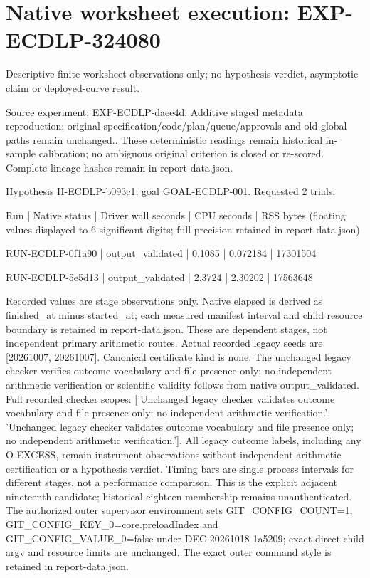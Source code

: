 \documentclass[10pt]{article}
\begin{document}
\section*{Native worksheet execution: EXP-ECDLP-324080}
Descriptive finite worksheet observations only; no hypothesis verdict, asymptotic claim or deployed-curve result.\par\medskip
Source experiment: EXP-ECDLP-daee4d. Additive staged metadata reproduction; original specification/code/plan/queue/approvals and old global paths remain unchanged.. These deterministic readings remain historical in-sample calibration; no ambiguous original criterion is closed or re-scored. Complete lineage hashes remain in report-data.json.\par\medskip
Hypothesis H-ECDLP-b093c1; goal GOAL-ECDLP-001. Requested 2 trials.\par\medskip
Run | Native status | Driver wall seconds | CPU seconds | RSS bytes (floating values displayed to 6 significant digits; full precision retained in report-data.json)\par
RUN-ECDLP-0f1a90 | output\_validated | 0.1085 | 0.072184 | 17301504\par
RUN-ECDLP-5e5d13 | output\_validated | 2.3724 | 2.30202 | 17563648\par\medskip
Recorded values are stage observations only. Native elapsed is derived as finished\_at minus started\_at; each measured manifest interval and child resource boundary is retained in report-data.json. These are dependent stages, not independent primary arithmetic routes. Actual recorded legacy seeds are [20261007, 20261007]. Canonical certificate kind is none. The unchanged legacy checker verifies outcome vocabulary and file presence only; no independent arithmetic verification or scientific validity follows from native output\_validated. Full recorded checker scopes: ['Unchanged legacy checker validates outcome vocabulary and file presence only; no independent arithmetic verification.', 'Unchanged legacy checker validates outcome vocabulary and file presence only; no independent arithmetic verification.']. All legacy outcome labels, including any O-EXCESS, remain instrument observations without independent arithmetic certification or a hypothesis verdict. Timing bars are single process intervals for different stages, not a performance comparison. This is the explicit adjacent nineteenth candidate; historical eighteen membership remains unauthenticated. The authorized outer supervisor environment sets GIT\_CONFIG\_COUNT=1, GIT\_CONFIG\_KEY\_0=core.preloadIndex and GIT\_CONFIG\_VALUE\_0=false under DEC-20261018-1a5209; exact direct child argv and resource limits are unchanged. The exact outer command style is retained in report-data.json.\par\medskip
\end{document}
